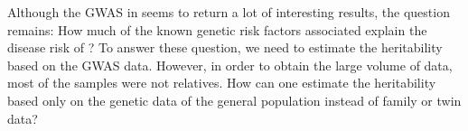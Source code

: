 	Although the \gls{GWAS} in  seems to return a lot of interesting results, the question remains: How much of the known genetic risk factors associated explain the disease risk of ?
	To answer these question, we need to estimate the heritability based on the \gls{GWAS} data. 
	However, in order to obtain the large volume of data, most of the samples were not relatives. 
	How can one estimate the heritability based only on the genetic data of the general population instead of family or twin data?
	